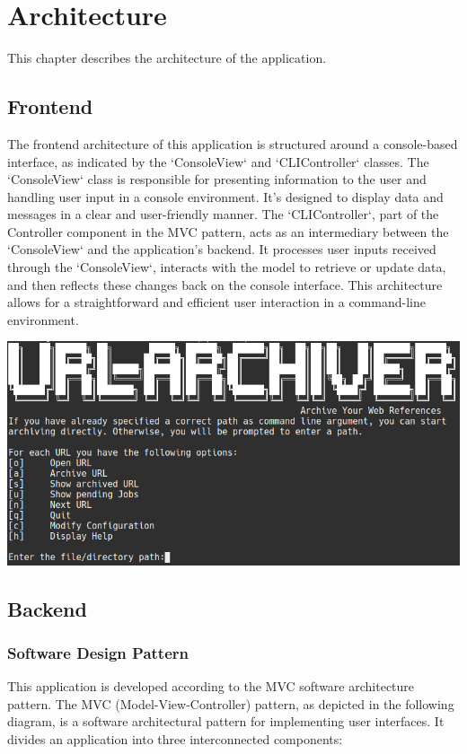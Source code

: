 \section{Architecture}
This chapter describes the architecture of the application. 

\subsection{Frontend}
The frontend architecture of this application is structured around a console-based interface, as indicated by the `ConsoleView` and `CLIController` classes. The `ConsoleView` class is responsible for presenting information to the user and handling user input in a console environment. It's designed to display data and messages in a clear and user-friendly manner. The `CLIController`, part of the Controller component in the MVC pattern, acts as an intermediary between the `ConsoleView` and the application's backend. It processes user inputs received through the `ConsoleView`, interacts with the model to retrieve or update data, and then reflects these changes back on the console interface. This architecture allows for a straightforward and efficient user interaction in a command-line environment.
\vskip 1cm
\begin{center}
    \includegraphics[width=1\textwidth]{pictures/final_presentation/command_line_application.jpg}
\end{center}

\clearpage

\subsection{Backend}

\subsubsection{Software Design Pattern}
This application is developed according to the MVC software architecture pattern. 
The MVC (Model-View-Controller) pattern, as depicted in the following diagram, is a software architectural pattern for implementing user interfaces. It divides an application into three interconnected components:

